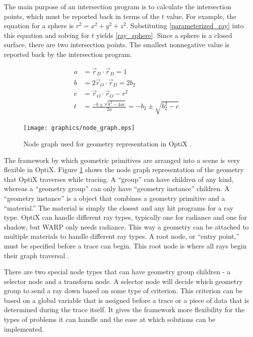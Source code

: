 The main purpose of an intersection program is to calculate the intersection points, which must be reported back in terms of the $t$ value.  For example, the equation for a sphere is $r^2=x^2+y^2+z^2$.  Substituting \eqref{parameterized_ray} into this equation and solving for $t$ yields \eqref{ray_sphere}.  Since a sphere is a closed surface, there are two intersection points.  The smallest nonnegative value is reported back by the intersection program.

\begin{equation}
\label{ray_sphere}
\begin{split}
a &= \vec{r}_D \cdot \vec{r}_D = 1\\
b &= 2 \vec{r}_O \cdot \vec{r}_D = 2b_2\\
c &= \vec{r}_O \cdot \vec{r}_O - r^2 \\
t &= \frac{-b \pm \sqrt{b^2-4ac}}{2a} = -b_2 \pm \sqrt{b_2^2-c}
\end{split}
\end{equation}

 \begin{figure}[h!] 
  \centering
    \texttt{[image: graphics/node\_graph.eps]}
     \caption[Node graph used for geometry representation in OptiX.]{Node graph used for geometry representation in OptiX \cite{optix}. \label{node_graph}}
\end{figure}

The framework by which geometric primitives are arranged into a scene is very flexible in OptiX.  Figure \ref{node_graph} shows the node graph representation of the geometry that OptiX traverses while tracing.   A ``group'' can have children of any kind, whereas a ``geometry group'' can only have ``geometry instance'' children.  A ``geometry instance'' is a object that combines a geometry primitive and a ``material.''  The material is simply the closest and any hit programs for a ray type.%
  OptiX can handle different ray types, typically one for radiance and one for shadow, but WARP only needs radiance.  This way a geometry can be attached to multiple materials to handle different ray types.  A root node, or ``entry point,'' must be specified before a trace can begin.  This root node is where all rays begin their graph traversal \cite{optix}.

There are two special node types that can have geometry group children - a selector node and a transform node.  A selector node will decide which geometry group to send a ray down based on some type of criterion.  This criterion can be based on a  global variable that is assigned before a trace or a piece of data that is determined during the trace itself.  It gives the framework more flexibility for the types of problems it can handle and the ease at which solutions can be implemented.  

